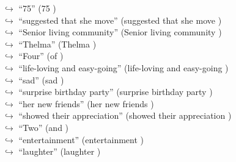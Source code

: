\documentclass[11pt,a4paper, onecolumn]{article}
\begin{document}
\begin{figure}[t] \small \begin{tcolorbox}[boxsep=0pt,left=5pt,right=0pt,top=2pt,colback = yellow!5] \begin{dialogue}
 \small 
\colorbox{pink!25}{$\hookrightarrow$}
{ ``75'' (75 ) }
\\
\colorbox{pink!25}{$\hookrightarrow$}
{ ``suggested that she move'' (suggested that she move ) }
\\
\colorbox{pink!25}{$\hookrightarrow$}
{ ``Senior living community'' (Senior living community ) }
\\
\colorbox{pink!25}{$\hookrightarrow$}
{ ``Thelma'' (Thelma ) }
\\
\colorbox{pink!25}{$\hookrightarrow$}
{ ``Four'' (of ) }
\\
\colorbox{pink!25}{$\hookrightarrow$}
{ ``life-loving and easy-going'' (life-loving and easy-going ) }
\\
\colorbox{pink!25}{$\hookrightarrow$}
{ ``sad'' (sad ) }
\\
\colorbox{pink!25}{$\hookrightarrow$}
{ ``surprise birthday party'' (surprise birthday party ) }
\\
\colorbox{pink!25}{$\hookrightarrow$}
{ ``her new friends'' (her new friends ) }
\\
\colorbox{pink!25}{$\hookrightarrow$}
{ ``showed their appreciation'' (showed their appreciation ) }
\\
\colorbox{pink!25}{$\hookrightarrow$}
{ ``Two'' (and ) }
\\
\colorbox{pink!25}{$\hookrightarrow$}
{ ``entertainment'' (entertainment ) }
\\
\colorbox{pink!25}{$\hookrightarrow$}
{ ``laughter'' (laughter ) }
\\

\end{dialogue}
\end{tcolorbox}
\end{figure}
\end{document}
